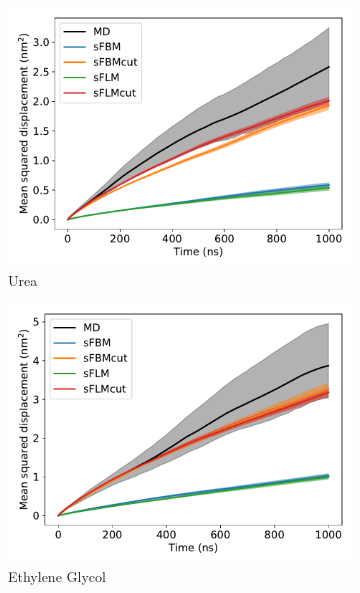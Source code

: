 \documentclass{article}
\begin{document}
  \begin{figure}
  \centering
  \begin{subfigure}{0.45\textwidth}
  \includegraphics[width=\textwidth]{1mode_msd_comparison_URE.pdf}
  \caption{Urea}\label{fig:1mode_msd_comparison_URE}
  \end{subfigure}
  \begin{subfigure}{0.45\textwidth}
  \includegraphics[width=\textwidth]{1mode_msd_comparison_GCL.pdf}
  \caption{Ethylene Glycol}\label{fig:1mode_msd_comparison_GCL}
  \end{subfigure}
  \begin{subfigure}{0.45\textwidth}

\end{subfigure}
\end{figure}
\end{document}
